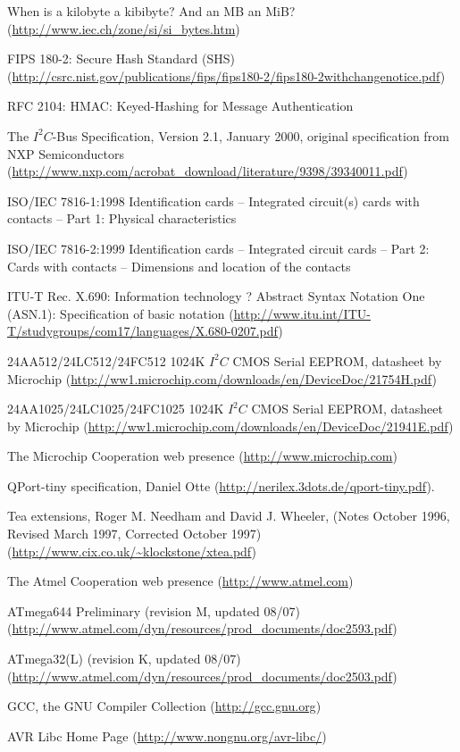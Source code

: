 \documentclass[10pt,a4paper,twocolumn]{article}
\begin{document}
\begin{thebibliography}{999}
 When is a kilobyte a kibibyte? And an MB an MiB? (\url{http://www.iec.ch/zone/si/si_bytes.htm})

 FIPS 180-2: Secure Hash Standard (SHS) (\url{http://csrc.nist.gov/publications/fips/fips180-2/fips180-2withchangenotice.pdf})
 
 RFC 2104: HMAC: Keyed-Hashing for Message Authentication

 The $I^2C$-Bus Specification, Version 2.1, January 2000, original specification from NXP Semiconductors (\url{http://www.nxp.com/acrobat_download/literature/9398/39340011.pdf})
 
 ISO/IEC 7816-1:1998 Identification cards -- Integrated circuit(s) cards with contacts -- Part 1: Physical characteristics

 ISO/IEC 7816-2:1999 Identification cards -- Integrated circuit cards -- Part 2: Cards with contacts -- Dimensions and location of the contacts

 ITU-T Rec. X.690: Information technology ? Abstract Syntax Notation One (ASN.1): Specification of basic notation (\url{http://www.itu.int/ITU-T/studygroups/com17/languages/X.680-0207.pdf})

  24AA512/24LC512/24FC512 1024K $I^2C$ CMOS Serial EEPROM, datasheet by Microchip (\url{http://ww1.microchip.com/downloads/en/DeviceDoc/21754H.pdf})

  24AA1025/24LC1025/24FC1025 1024K $I^2C$ CMOS Serial EEPROM, datasheet by Microchip (\url{http://ww1.microchip.com/downloads/en/DeviceDoc/21941E.pdf})

 The Microchip Cooperation web presence (\url{http://www.microchip.com})

 QPort-tiny specification, Daniel Otte (\url{http://nerilex.3dots.de/qport-tiny.pdf}).

 Tea extensions, Roger M. Needham and David J. Wheeler, (Notes October 1996, Revised March 1997,      Corrected October 1997) (\url{http://www.cix.co.uk/~klockstone/xtea.pdf})

 The Atmel Cooperation web presence (\url{http://www.atmel.com})  

 ATmega644 Preliminary (revision M, updated 08/07)  (\url{http://www.atmel.com/dyn/resources/prod_documents/doc2593.pdf})

 ATmega32(L) (revision K, updated 08/07)  (\url{http://www.atmel.com/dyn/resources/prod_documents/doc2503.pdf})

 GCC, the GNU Compiler Collection (\url{http://gcc.gnu.org})
 
 AVR Libc Home Page (\url{http://www.nongnu.org/avr-libc/})
\end{thebibliography}
\end{document}
